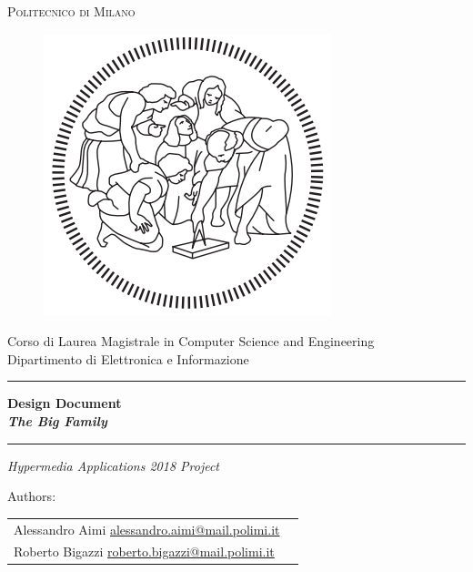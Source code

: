 \documentclass[a4paper,12pt,twoside]{report}
\begin{document}

\thispagestyle{empty}
\enlargethispage{40mm}
\begin{center}
\Large{\textsc{Politecnico di Milano}}\\
\begin{figure}[h]
\begin{center}
\includegraphics[scale=0.25]{images/logoPolimi.png}
\end{center}
\end{figure}
\vspace{-8mm}
\large{Corso di Laurea Magistrale in Computer Science and Engineering}\\
\large{Dipartimento di Elettronica e Informazione}\\
\vspace{15mm}

\begin{center}
\noindent\rule{17cm}{0.4pt}
\end{center}

\vspace{1mm}
{\textbf{\Huge{Design Document}}} \\
\vspace{5mm}
{\textbf{\textit{\Large{The Big Family}}}} \\
\noindent\rule{17cm}{0.4pt}

\vspace{10mm}

{\Large{\textit{Hypermedia Applications 2018 Project}}}


\begin{center}
\vspace{55mm}
Authors:
\vspace{-3mm}
\end{center}
\begin{center}
\begin{tabular}{l l }
Alessandro Aimi \href{mailto:alessandro.aimi@mail.polimi.it}{alessandro.aimi@mail.polimi.it}  \\
Roberto Bigazzi \href{mailto:roberto.bigazzi@mail.polimi.it}{roberto.bigazzi@mail.polimi.it}
\end{tabular}
\end{center}
\end{center}
\end{document}
